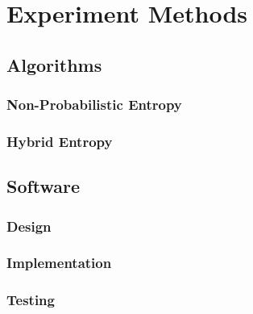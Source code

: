 \chapter{Experiment Methods}





\section{Algorithms}

\subsection{Non-Probabilistic Entropy}

\subsection{Hybrid Entropy}

\section{Software}

\subsection{Design}

\subsection{Implementation}

\subsection{Testing}

